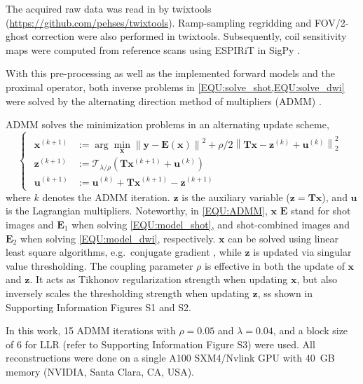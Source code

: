 \documentclass[preprint,12pt,authoryear,review]{elsarticle}
\newcommand*{\norm}[1]{\left\lVert#1\right\rVert}
\newcommand{\argmin}{\arg\!\min}
\begin{document}
	The acquired raw data was read in by twixtools
	(\url{https://github.com/pehses/twixtools}).
	Ramp-sampling regridding and FOV/2-ghost correction were also performed in twixtools.
	Subsequently, coil sensitivity maps were computed from reference scans
	using ESPIRiT \citep{uecker_2014_espirit} in SigPy \citep{ong_2019_sigpy}.

	With this pre-processing as well as
	the implemented forward models and the proximal operator,
	both inverse problems in \cref{EQU:solve_shot,EQU:solve_dwi} were solved by
	the alternating direction method of multipliers (ADMM) \citep{boyd_2010_admm}.

	ADMM solves the minimization problems in an alternating update scheme,
	\begin{equation}
		\left\{\begin{matrix}
			\begin{aligned}
				\mathbf{x}^{(k+1)} &:= \argmin_{\mathbf{x}} \norm{\mathbf{y} - \mathbf{E}(\mathbf{x})}^2 + \rho/2 \norm{\mathbf{T}\mathbf{x} - \mathbf{z}^{(k)} + \mathbf{u}^{(k)}}_2^2 \\
				\mathbf{z}^{(k+1)} &:= \mathcal{T}_{\lambda/\rho} (\mathbf{T} \mathbf{x}^{(k+1)} + \mathbf{u}^{(k)}) \\
				\mathbf{u}^{(k+1)} &:= \mathbf{u}^{(k)} + \mathbf{T} \mathbf{x}^{(k+1)} - \mathbf{z}^{(k+1)}
			\end{aligned}
		\end{matrix}\right.
		\label{EQU:ADMM}
	\end{equation}
	where $k$ denotes the ADMM iteration.
        $\mathbf{z}$ is the auxiliary variable ($\mathbf{z} = \mathbf{T}\mathbf{x}$),
        and $\textbf{u}$ is the Lagrangian multipliers.
        Noteworthy, in \cref{EQU:ADMM},
        $\mathbf{x}$ $\mathbf{E}$ stand for shot images and $\mathbf{E}_1$ when solving \cref{EQU:model_shot},
        and shot-combined images and $\mathbf{E}_2$ when solving \cref{EQU:model_dwi}, respectively.
	$\mathbf{x}$ can be solved using linear least square algorithms,
	e.g.~conjugate gradient \citep{hestenes_1952_cg},
	while $\mathbf{z}$ is updated via singular value thresholding.
	The coupling parameter $\rho$ is effective in both the update of $\mathbf{x}$ and $\mathbf{z}$.
	It acts as Tikhonov regularization strength when updating $\mathbf{x}$,
	but also inversely scales the thresholding strength when updating $\mathbf{z}$,
        ss shown in Supporting Information Figures S1 and S2.

	In this work, 15 ADMM iterations with $\rho = 0.05$ and $\lambda = 0.04$,
	and a block size of 6 for LLR (refer to Supporting Information Figure S3)
	were used.
	All reconstructions were done on a single A100 SXM4/Nvlink GPU
	with \SI{40}{GB} memory (NVIDIA, Santa Clara, CA, USA).
\end{document}
